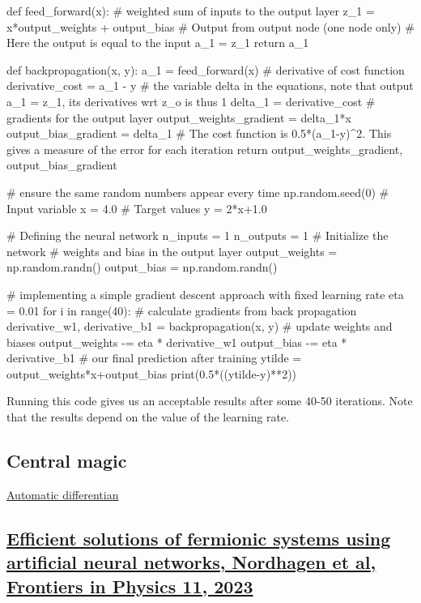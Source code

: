 \documentclass[%
oneside,                 %
final,                   %
10pt]{article}
\begin{document}
def feed_forward(x):
    # weighted sum of inputs to the output layer
    z_1 = x*output_weights + output_bias
    # Output from output node (one node only)
    # Here the output is equal to the input
    a_1 = z_1
    return a_1

def backpropagation(x, y):
    a_1 = feed_forward(x)
    # derivative of cost function
    derivative_cost = a_1 - y
    # the variable delta in the equations, note that output a_1 = z_1, its derivatives wrt z_o is thus 1
    delta_1 = derivative_cost
    # gradients for the output layer
    output_weights_gradient = delta_1*x
    output_bias_gradient = delta_1
    # The cost function is 0.5*(a_1-y)^2. This gives a measure of the error for each iteration
    return output_weights_gradient, output_bias_gradient

# ensure the same random numbers appear every time
np.random.seed(0)
# Input variable
x = 4.0
# Target values
y = 2*x+1.0

# Defining the neural network
n_inputs = 1
n_outputs = 1
# Initialize the network
# weights and bias in the output layer
output_weights = np.random.randn()
output_bias = np.random.randn()

# implementing a simple gradient descent approach with fixed learning rate
eta = 0.01
for i in range(40):
    # calculate gradients from back propagation
    derivative_w1, derivative_b1 = backpropagation(x, y)
    # update weights and biases
    output_weights -= eta * derivative_w1
    output_bias -= eta * derivative_b1
# our final prediction after training
ytilde = output_weights*x+output_bias
print(0.5*((ytilde-y)**2))


\epycod

Running this code gives us an acceptable results after some 40-50 iterations. Note that the results depend on the value of the learning rate.

\subsection{Central magic}

\href{{https://en.wikipedia.org/wiki/Automatic_differentiation}}{Automatic differentian}

\subsection{\href{{https://doi.org/10.3389/fphy.2023.1061580}}{Efficient solutions of fermionic systems using artificial neural networks, Nordhagen et al, Frontiers in Physics 11, 2023}}
\end{document}
